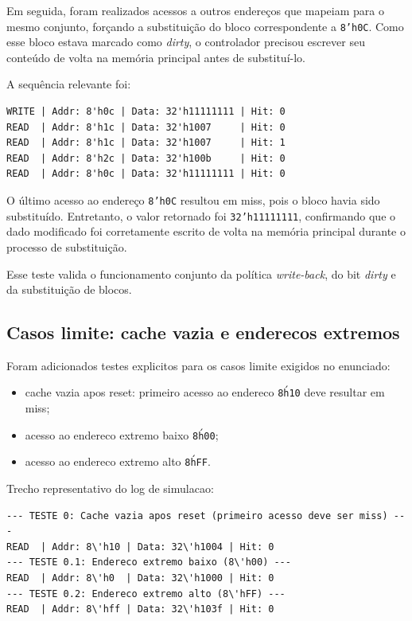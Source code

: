 ﻿\documentclass[12pt,a4paper]{article}
\begin{document}
Em seguida, foram realizados acessos a outros endereços que mapeiam para o mesmo conjunto, forçando a substituição do bloco correspondente a \texttt{8'h0C}. Como esse bloco estava marcado como \textit{dirty}, o controlador precisou escrever seu conteúdo de volta na memória principal antes de substituí-lo.

A sequência relevante foi:

\begin{verbatim}
WRITE | Addr: 8'h0c | Data: 32'h11111111 | Hit: 0
READ  | Addr: 8'h1c | Data: 32'h1007     | Hit: 0
READ  | Addr: 8'h1c | Data: 32'h1007     | Hit: 1
READ  | Addr: 8'h2c | Data: 32'h100b     | Hit: 0
READ  | Addr: 8'h0c | Data: 32'h11111111 | Hit: 0
\end{verbatim}

O último acesso ao endereço \texttt{8'h0C} resultou em miss, pois o bloco havia sido substituído. Entretanto, o valor retornado foi \texttt{32'h11111111}, confirmando que o dado modificado foi corretamente escrito de volta na memória principal durante o processo de substituição.

Esse teste valida o funcionamento conjunto da política \textit{write-back}, do bit \textit{dirty} e da substituição de blocos.

\subsection{Casos limite: cache vazia e enderecos extremos}
Foram adicionados testes explicitos para os casos limite exigidos no enunciado:
\begin{itemize}
    \item cache vazia apos reset: primeiro acesso ao endereco \texttt{8\'h10} deve resultar em miss;
    \item acesso ao endereco extremo baixo \texttt{8\'h00};
    \item acesso ao endereco extremo alto \texttt{8\'hFF}.
\end{itemize}

Trecho representativo do log de simulacao:
\begin{verbatim}
--- TESTE 0: Cache vazia apos reset (primeiro acesso deve ser miss) ---
READ  | Addr: 8\'h10 | Data: 32\'h1004 | Hit: 0
--- TESTE 0.1: Endereco extremo baixo (8\'h00) ---
READ  | Addr: 8\'h0  | Data: 32\'h1000 | Hit: 0
--- TESTE 0.2: Endereco extremo alto (8\'hFF) ---
READ  | Addr: 8\'hff | Data: 32\'h103f | Hit: 0
\end{verbatim}
\end{document}
